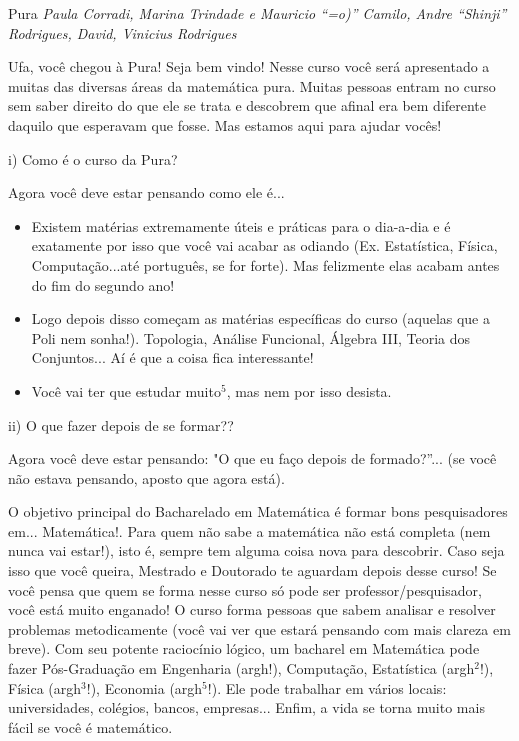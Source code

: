 \begin{subsecao}{Pura}
{\em Paula Corradi, Marina Trindade e Mauricio ``=o)'' Camilo,
Andre “Shinji” Rodrigues, David, Vinicius Rodrigues}


Ufa, você chegou à Pura! Seja bem vindo! Nesse curso você será apresentado a muitas das diversas áreas da matemática pura. Muitas pessoas entram no curso sem saber direito do que ele se trata e descobrem que afinal era bem diferente daquilo que esperavam que fosse. Mas estamos aqui para ajudar vocês!

i) Como é o curso da Pura?

Agora você deve estar pensando como ele é...
\begin{itemize}


\item  Existem matérias extremamente úteis e práticas para o dia-a-dia e é
exatamente por isso que você vai acabar as odiando (Ex. Estatística, Física,
Computação...até português, se for forte). Mas felizmente elas acabam antes do fim do segundo ano!
\item  Logo depois disso começam as matérias específicas do curso (aquelas que a Poli nem sonha!). Topologia, Análise Funcional, Álgebra III, Teoria dos Conjuntos... Aí é que a coisa fica interessante!
\item  Você vai ter que estudar muito$^5$, mas nem por isso desista.

\end{itemize}
ii) O que fazer depois de se formar??

Agora você deve estar pensando: "O que eu faço depois de formado?”... (se você
não estava pensando, aposto que agora está).

O objetivo principal do Bacharelado em Matemática é formar bons pesquisadores em... Matemática!. Para quem não
sabe a matemática não está completa (nem nunca vai estar!), isto é, sempre tem alguma coisa nova para
descobrir. Caso seja isso que você queira, Mestrado e Doutorado te aguardam depois desse curso! Se você pensa que quem se forma nesse curso só pode ser
professor/pesquisador, você está muito enganado! O curso forma pessoas que
sabem analisar e resolver problemas metodicamente (você vai ver que estará
pensando com mais clareza em breve). Com seu potente raciocínio lógico, um
bacharel em Matemática pode fazer Pós-Graduação em Engenharia (argh!),
Computação, Estatística (argh$^2$!), Física (argh$^3$!), Economia (argh$^5$!).
Ele pode trabalhar em vários locais: universidades, colégios, bancos,
empresas... Enfim, a vida se torna muito mais fácil se você é matemático.


\end{subsecao}
